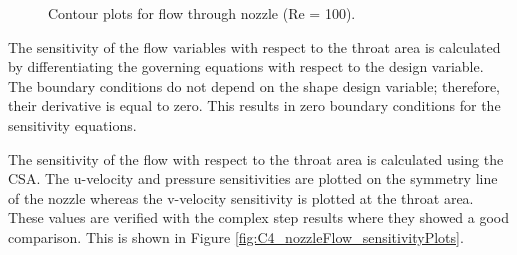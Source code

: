 \begin{figure}[H]
    \centering
    \quad
    \caption{Contour plots for flow through nozzle (Re = 100).}
    \label{fig:C4_nozzleFlow_contourForAnalysis}
\end{figure}

The sensitivity of the flow variables with respect to the throat area is calculated by differentiating the governing equations with respect to the design variable. The boundary conditions do not depend on the shape design variable; therefore, their derivative is equal to zero. This results in zero boundary conditions for the sensitivity equations.

The sensitivity of the flow with respect to the throat area is calculated using the CSA. The u-velocity and pressure sensitivities are plotted on the symmetry line of the nozzle whereas the v-velocity sensitivity is plotted at the throat area. These values are verified with the complex step results where they showed a good comparison. This is shown in Figure \ref{fig:C4_nozzleFlow_sensitivityPlots}.

